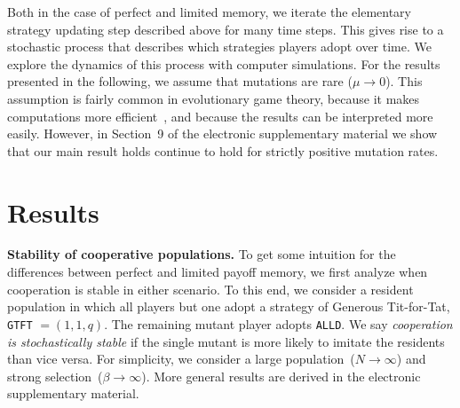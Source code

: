 \documentclass[11pt]{article}
\def\alld{\texttt{ALLD}}
\def\gtft{\texttt{GTFT}}
\def\esm{electronic supplementary material}
\theoremstyle{plainCl1}
\theoremstyle{plainCl2}
\begin{document}

Both in the case of perfect and limited memory, we iterate the elementary strategy updating step described above for many time steps. 
This gives rise to a stochastic process that describes which strategies players adopt over time. 
We explore the dynamics of this process with computer simulations.
For the results presented in the following, we assume that mutations are rare (\(\mu\!\rightarrow\! 0\)). 
This assumption is fairly common in evolutionary game theory, because it makes computations more efficient~\citep{fudenberg:JET:2006,wu:JMB:2012,mcavoy:jet:2015}, and because the results can be interpreted more easily.  
However, in Section~9 of the \esm{} we show that our main result holds continue to hold for strictly positive mutation rates.



\section{Results}


\noindent
{\bf Stability of cooperative populations.}
To get some intuition for the differences between perfect and limited payoff memory, we first analyze when cooperation is stable in either scenario.
To this end, we consider a resident population in which all players but one adopt a strategy of Generous Tit-for-Tat, \gtft{} $=\!(1,1,q)$. 
The remaining mutant player adopts \alld. 
We say {\it cooperation is stochastically stable} if the single mutant is more likely to imitate the residents than vice versa. 
For simplicity, we consider a large population~($N\!\rightarrow\!\infty$) and strong selection~($\beta\!\rightarrow\!\infty$).
More general results are derived in the \esm. 

\end{document}
